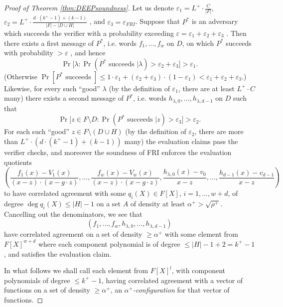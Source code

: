 \documentclass[11pt,article,oneside]{memoir}
\theoremstyle{definition}
\theoremstyle{remark}
\begin{document}
\begin{proof}[Proof of Theorem \ref{thm:DEEPsoundness}]
Let us denote $\varepsilon_1=L^+ \cdot \frac{C}{|F|}$, $\varepsilon_2 = L^+ \cdot  \frac{d\cdot (k^+ - 1) + (k - 1)}{|F| - |D\cup H|}$ , and $\varepsilon_3=\varepsilon_{FRI}$. 
Suppose that $P^*$ is an adversary which succeeds the verifier with a probability exceeding $\varepsilon =\varepsilon_1+\varepsilon_2+\varepsilon_3$ .
Then there exists a first message of $P^*$, i.e. words  $f_1, \ldots, f_w$  on $D$, on which $P^*$ succeeds with probability $> \varepsilon$ , and hence
\[
\Pr\big[\lambda : \Pr\left(P^*\text{ succeeds } |\lambda\right) > \varepsilon_2+\varepsilon_3 \big] > \varepsilon_1.
\]
(Otherwise $\Pr[P^*\text{ succeeds }] \leq 1\cdot \varepsilon_1+ (\varepsilon_2 + \varepsilon_3)\cdot (1-\varepsilon_1) < \varepsilon_1+ \varepsilon_2 + \varepsilon_3$.) 
Likewise, for every such “good” $\lambda$ (by the definition of $\varepsilon_1$, there are at least $L^+\cdot C$ many) there exists a second message of $P^*$, i.e. words $h_{\lambda, 0}, \ldots, h_{\lambda, d-1}$ on $D$ such that 
\[
\Pr\big[ z\in F\setminus D :  \Pr(P^*\text{ succeeds }| z) >\varepsilon_3 \big] > \varepsilon_2.
\]
For each such “good” $z\in F\setminus (D\cup H)$ (by the definition of $\varepsilon_2$, there are more than $L^+\cdot \left(d\cdot (k^+ - 1) + (k - 1)\right)$ many) the evaluation claims pass the verifier checks, and moreover the soundness of FRI enforces the evaluation quotients
\[ 
\left( 
\frac{f_1(x)-V_1(x)}{(x-z)\cdot (x-g\cdot z)}, \ldots, \frac{f_w(x)-V_w(x)}{(x-z)\cdot (x-g\cdot z)}, \frac{h_{\lambda,0}(x)- v_0}{x-z}, \ldots , \frac{h_{d - 1}(x) -v_{d-1}}{x-z}
\right)
\]
to have correlated agreement with some $q_i(X)\in F[X]$, $i=1,...,w +d$, of degree $\deg q_i(X) \leq |H|-1$ on a set $A$ of density at least 
$
\alpha^+ %
> \sqrt{\rho^+}.
$ 
Cancelling out the denominators, we see that 
\[
(f_1,\ldots, f_w, h_{\lambda,0}, \ldots, h_{\lambda,d-1})
\]
have correlated agreement on a set of density $\geq \alpha^+$ with some  element from $F[X]^{w+d}$
where each component polynomial is of degree $\leq |H| - 1 + 2 = k^+ -1$, and satisfies the evaluation claim.

In what follows we shall call each element from  $F[X]^{l}$, with component polynomials of degree $\leq k^+ - 1$, having correlated agreement with a vector of functions on a set of density $\geq \alpha^+$, an \textit{$\alpha^+$-configuration} for that vector of functions. 


\end{proof}
\end{document}
